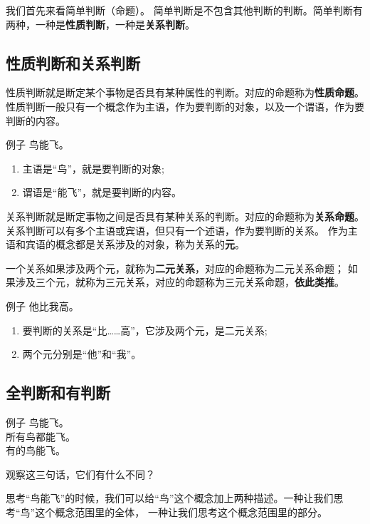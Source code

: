 \documentclass[12pt,UTF8,a4paper]{article}
\begin{document}
我们首先来看简单判断（命题）。
简单判断是不包含其他判断的判断。简单判断有两种，一种是\textbf{性质判断}，一种是\textbf{关系判断}。

\subsection{性质判断和关系判断}

性质判断就是断定某个事物是否具有某种属性的判断。对应的命题称为\textbf{性质命题}。
性质判断一般只有一个概念作为主语，作为要判断的对象，以及一个谓语，作为要判断的内容。

\begin{blockin}{例子}
    鸟能飞。
    \begin{enumerate}
        \item 主语是“鸟”，就是要判断的对象;
        \item 谓语是“能飞”，就是要判断的内容。
    \end{enumerate}
\end{blockin}

关系判断就是断定事物之间是否具有某种关系的判断。对应的命题称为\textbf{关系命题}。
关系判断可以有多个主语或宾语，但只有一个述语，作为要判断的关系。
作为主语和宾语的概念都是关系涉及的对象，称为关系的\textbf{元}。

一个关系如果涉及两个元，就称为\textbf{二元关系}，对应的命题称为二元关系命题；
如果涉及三个元，就称为三元关系，对应的命题称为三元关系命题，\textbf{依此类推}。

\begin{blockin}{例子}
    他比我高。
    \begin{enumerate}
        \item 要判断的关系是“比……高”，它涉及两个元，是二元关系;
        \item 两个元分别是“他”和“我”。
    \end{enumerate}
\end{blockin}

\subsection{全判断和有判断}

\begin{blockin}{例子}
    鸟能飞。\\
    所有鸟都能飞。\\
    有的鸟能飞。
\end{blockin}

观察这三句话，它们有什么不同？

思考“鸟能飞”的时候，我们可以给“鸟”这个概念加上两种描述。一种让我们思考“鸟”这个概念范围里的全体，
一种让我们思考这个概念范围里的部分。
\end{document}
